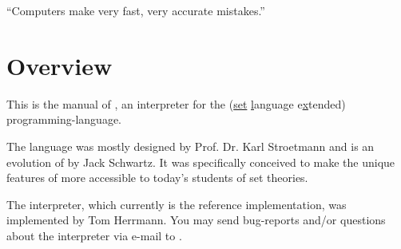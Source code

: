 


\globalDate{\today}







\begin{titlepage}
\maketitle

\vfill

\begin{center}
\Large
``Computers make very fast, very accurate mistakes.''
\end{center}

\vfill
\tableofcontents
\end{titlepage}

\section{Overview}

This is the manual of \setlX, an interpreter for the \SetlX{} (\underline{set} \underline{l}anguage e\underline{x}tended) programming-language.

The \SetlX{} language was mostly designed by Prof. Dr. Karl Stroetmann and is an evolution of \Setl{} by Jack Schwartz. It was specifically conceived to make the unique features of \Setl{} more accessible to today's students of set theories.

The \setlX{} interpreter, which currently is the \SetlX{} reference implementation, was implemented by Tom Herrmann. You may send bug-reports and\slash{}or questions about the \setlX{} interpreter via e-mail to .


